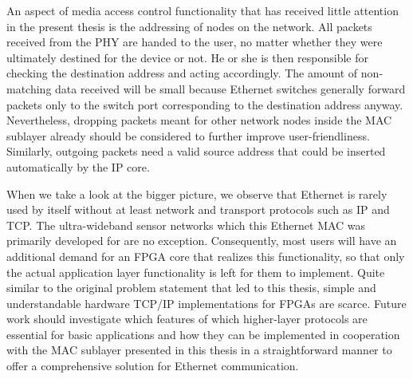 \documentclass[a4paper, 11pt, oneside]{Thesis}  %
\begin{document}
An aspect of media access control functionality that has received little attention in the present thesis is the addressing of nodes on the network. All packets received from the PHY are handed to the user, no matter whether they were ultimately destined for the device or not. He or she is then responsible for checking the destination address and acting accordingly. The amount of non-matching data received will be small because Ethernet switches generally forward packets only to the switch port corresponding to the destination address anyway. Nevertheless, dropping packets meant for other network nodes inside the MAC sublayer already should be considered to further improve user-friendliness. Similarly, outgoing packets need a valid source address that could be inserted automatically by the IP core.

When we take a look at the bigger picture, we observe that Ethernet is rarely used by itself without at least network and transport protocols such as IP and TCP. The ultra-wideband sensor networks which this Ethernet MAC was primarily developed for are no exception. Consequently, most users will have an additional demand for an FPGA core that realizes this functionality, so that only the actual application layer functionality is left for them to implement. Quite similar to the original problem statement that led to this thesis, simple and understandable hardware TCP/IP implementations for FPGAs are scarce. Future work should investigate which features of which higher-layer protocols are essential for basic applications and how they can be implemented in cooperation with the MAC sublayer presented in this thesis in a straightforward manner to offer a comprehensive solution for Ethernet communication.





\end{document}
